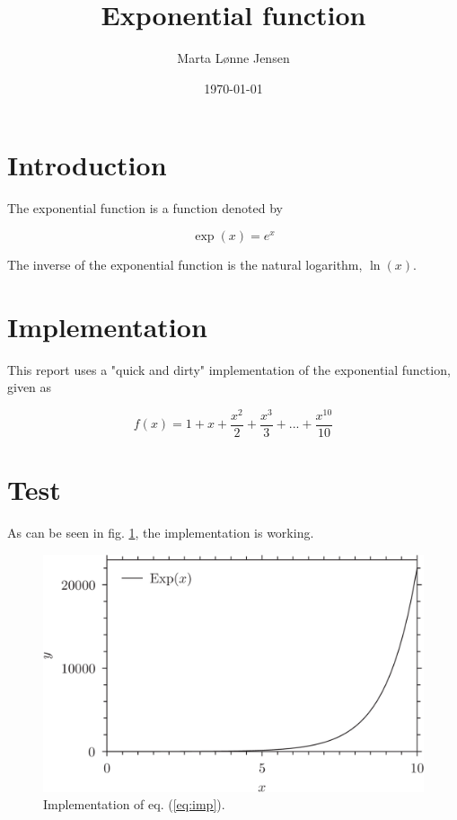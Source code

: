 \documentclass[twocolumn]{article}
\title{Exponential function}
\author{Marta Lønne Jensen}
\date{\today}
\begin{document}
\maketitle

\section{Introduction}

The exponential function is a function denoted by

\begin{equation}
	\exp(x) = e^x
\end{equation}

The inverse of the exponential function is the natural logarithm, $\ln(x)$.
\section{Implementation}

This report uses a "quick and dirty" implementation of the exponential function, given as

\begin{equation}
\label{eq:imp}
	f(x) = 1 + x + \frac{x^2}{2} + \frac{x^3}{3} + ... + \frac{x^{10}}{10}
\end{equation}



\section{Test}

As can be seen in fig. \ref{fig:exp}, the implementation is working.

\begin{figure}
	\label{fig:exp}
	\includegraphics{exp.png}
	\caption{Implementation of eq. (\ref{eq:imp}).}
\end{figure}
\end{document}
